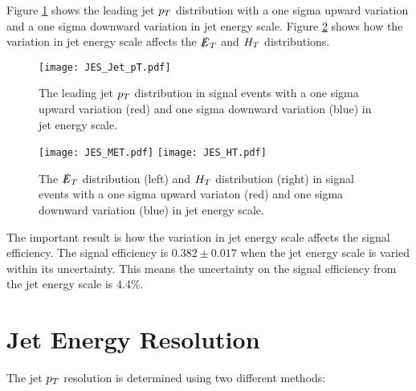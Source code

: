 Figure \ref{fig:JES_Jet_pT} shows the leading jet $p_{T}$ distribution with a one 
sigma upward variation and a one sigma downward variation in jet energy scale. 
Figure \ref{fig:JES_MET_And_HT} shows how the variation in jet energy scale 
affects the $\slashed{E}_{T}$ and $H_{T}$ distributions. \\

\begin{figure}
\begin{center}
\texttt{[image: JES\_Jet\_pT.pdf]}
\end{center}
\caption{The leading jet $p_{T}$ distribution in signal events with a one sigma
upward variation (red) and one sigma downward variation (blue) in jet energy
scale.}
\label{fig:JES_Jet_pT}
\end{figure}

\begin{figure}
\texttt{[image: JES\_MET.pdf]}
\texttt{[image: JES\_HT.pdf]}
\caption{The $\slashed{E}_{T}$ distribution (left) and $H_{T}$ distribution (right) in signal
events with a one sigma upward variaton (red) and one sigma downward variation
(blue) in jet energy scale.}
\label{fig:JES_MET_And_HT}
\end{figure}

The important result is how the variation in jet energy scale affects the signal
efficiency. The signal efficiency is $0.382\pm0.017$ when the jet energy scale
is varied within its uncertainty. This means the uncertainty on the signal
efficiency from the jet energy scale is 4.4\unit{\%}.

\section{Jet Energy Resolution}

The jet $p_{T}$ resolution is determined using two different methods: 

